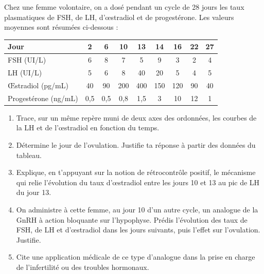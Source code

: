 \documentclass[11pt]{article}
\newcounter{popsec}
\newcounter{popsub}
\newcommand{\courssub}[1]{%
  \stepcounter{popsub}%
  \par\vspace{9pt}\noindent{\popxbold\fontsize{11.5}{13}\selectfont\color{popink}{\color{poporange}\thepopsec.\thepopsub}\hspace{6pt}#1}\par\nopagebreak\vspace{4pt}
}
\begin{document}
\courssub{Je me prépare au Bac}

\begin{exercice}
Chez une femme volontaire, on a dosé pendant un cycle de 28 jours les taux plasmatiques de FSH, de LH, d'œstradiol et de progestérone. Les valeurs moyennes sont résumées ci-dessous :
\begin{center}
\begin{tabular}{|l|c|c|c|c|c|c|c|c|}
\hline
\rowcolor{popblueL} Jour & 2 & 6 & 10 & 13 & 14 & 16 & 22 & 27 \\
\hline
FSH (UI/L) & 6 & 8 & 7 & 5 & 9 & 3 & 2 & 4 \\
\hline
LH (UI/L) & 5 & 6 & 8 & 40 & 20 & 5 & 4 & 5 \\
\hline
Œstradiol (pg/mL) & 40 & 90 & 200 & 400 & 150 & 120 & 90 & 40 \\
\hline
Progestérone (ng/mL) & 0,5 & 0,5 & 0,8 & 1,5 & 3 & 10 & 12 & 1 \\
\hline
\end{tabular}
\end{center}
\begin{enumerate}
\item Trace, sur un même repère muni de deux axes des ordonnées, les courbes de la LH et de l'œstradiol en fonction du temps.
\item Détermine le jour de l'ovulation. Justifie ta réponse à partir des données du tableau.
\item Explique, en t'appuyant sur la notion de rétrocontrôle positif, le mécanisme qui relie l'évolution du taux d'œstradiol entre les jours 10 et 13 au pic de LH du jour 13.
\item On administre à cette femme, au jour 10 d'un autre cycle, un analogue de la GnRH à action bloquante sur l'hypophyse. Prédis l'évolution des taux de FSH, de LH et d'œstradiol dans les jours suivants, puis l'effet sur l'ovulation. Justifie.
\item Cite une application médicale de ce type d'analogue dans la prise en charge de l'infertilité ou des troubles hormonaux.
\end{enumerate}
\end{exercice}
\end{document}
